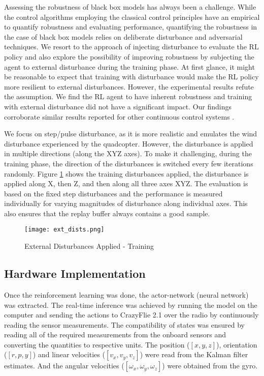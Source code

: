 \documentclass[../templateLTHtwocol.tex]{subfiles}
\begin{document}
Assessing the robustness of black box models has always been a challenge. While the control algorithms employing the classical control principles have an empirical to quantify robustness and evaluating performance, quantifying the robustness in the case of black box models relies on deliberate disturbance and adversarial techniques. We resort to the approach of injecting disturbance to evaluate the RL policy and also explore the possibility of improving robustness by subjecting the agent to external disturbance during the training phase. At first glance, it might be reasonable to expect that training with disturbance would make the RL policy more resilient to external disturbances. However, the experimental results refute the assumption. We find the RL agent to have inherent robustness and training with external disturbance did not have a significant impact. Our findings corroborate similar results reported for other continuous control systems \cite{charac_robustness}.

We focus on step/pulse disturbance, as it is more realistic and emulates the wind disturbance experienced by the quadcopter. However, the disturbance is applied in multiple directions (along the XYZ axes). To make it challenging, during the training phase, the direction of the disturbances is switched every few iterations randomly. Figure \ref{rob_ext_dists:fig} shows the training disturbances applied, the disturbance is applied along X, then Z, and then along all three axes XYZ. The evaluation is based on the fixed step disturbances and the performance is measured individually for varying magnitudes of disturbance along individual axes. This also ensures that the replay buffer always contains a good sample.

\begin{figure}[H]
	\centering
	\caption{External Disturbances Applied - Training}
	\texttt{[image: ext\_dists.png]}
	\label{rob_ext_dists:fig}
\end{figure}

\subsection{Hardware Implementation}

Once the reinforcement learning was done, the actor-network (neural network) was extracted. The real-time inference was achieved by running the model on the computer and sending the actions to CrazyFlie 2.1 over the radio by continuously reading the sensor measurements. The compatibility of states was ensured by reading all of the required measurements from the onboard sensors and converting the quantities to respective units. The position ($[x, y, z]$), orientation ($[r, p, y]$) and linear velocities ($[v_x, v_y, v_z]$) were read from the Kalman filter estimates. And the angular velocities ($[\omega_x, \omega_y, \omega_z]$) were obtained from the gyro.
\end{document}
